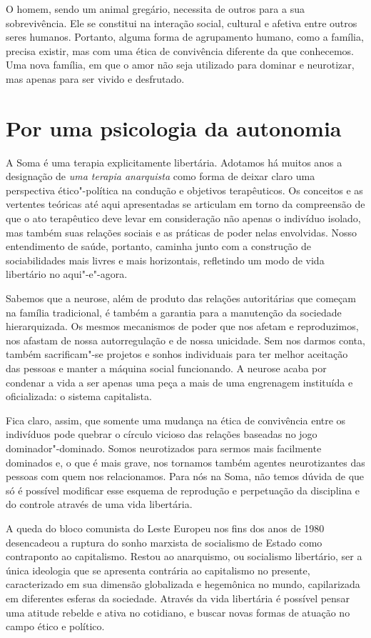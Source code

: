 O homem, sendo um animal gregário, necessita de outros para a sua
sobrevivência. Ele se constitui na interação social, cultural e afetiva
entre outros seres humanos. Portanto, alguma forma de agrupamento
humano, como a família, precisa existir, mas com uma ética de
convivência diferente da que conhecemos. Uma nova família, em que o amor
não seja utilizado para dominar e neurotizar, mas apenas para ser vivido
e desfrutado.

\section{Por uma psicologia da autonomia}

A Soma é uma terapia explicitamente libertária. Adotamos há muitos anos
a designação de \emph{uma terapia anarquista} como forma de deixar claro
uma perspectiva ético"-política na condução e objetivos terapêuticos. Os
conceitos e as vertentes teóricas até aqui apresentadas se articulam em
torno da compreensão de que o ato terapêutico deve levar em consideração
não apenas o indivíduo isolado, mas também suas relações sociais e as
práticas de poder nelas envolvidas. Nosso entendimento de saúde,
portanto, caminha junto com a construção de sociabilidades mais livres e
mais horizontais, refletindo um modo de vida libertário no aqui"-e"-agora.

Sabemos que a neurose, além de produto das relações autoritárias que
começam na família tradicional, é também a garantia para a manutenção da
sociedade hierarquizada. Os mesmos mecanismos de poder que nos afetam
e reproduzimos, nos afastam de nossa autorregulação e de nossa
unicidade. Sem nos darmos conta, também sacrificam"-se projetos e sonhos
individuais para ter melhor aceitação das pessoas e manter a máquina
social funcionando. A neurose acaba por condenar a vida a ser apenas uma
peça a mais de uma engrenagem instituída e oficializada: o sistema
capitalista.

Fica claro, assim, que somente uma mudança na ética de convivência entre
os indivíduos pode quebrar o círculo vicioso das relações baseadas no
jogo dominador"-dominado. Somos neurotizados para sermos mais facilmente
dominados e, o que é mais grave, nos tornamos também agentes
neurotizantes das pessoas com quem nos relacionamos. Para nós na Soma,
não temos dúvida de que só é possível modificar esse esquema de
reprodução e perpetuação da disciplina e do controle através de uma vida
libertária.

A queda do bloco comunista do Leste Europeu nos fins dos anos de 1980
desencadeou a ruptura do sonho marxista de socialismo de Estado como
contraponto ao capitalismo. Restou ao anarquismo, ou socialismo
libertário, ser a única ideologia que se apresenta contrária ao
capitalismo no presente, caracterizado em sua dimensão globalizada e
hegemônica no mundo, capilarizada em diferentes esferas da sociedade.
Através da vida libertária é possível pensar uma atitude rebelde e ativa
no cotidiano, e buscar novas formas de atuação no campo ético e
político.

